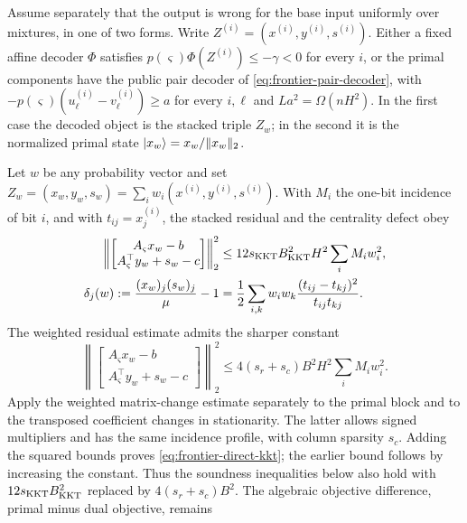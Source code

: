 \begin{proposition}
\label{prop:frontier-central-dichotomy}
Assume separately that the output is wrong for the base input uniformly
over mixtures, in one of two forms.  Write
\(Z^{(i)}=(x^{(i)},y^{(i)},s^{(i)})\).  Either a fixed affine
decoder \(\Phi\) satisfies
\(p(\varsigma)\Phi(Z^{(i)})\leq-\gamma<0\) for every \(i\), or the
primal components have the public pair decoder of
\eqref{eq:frontier-pair-decoder}, with
\(-p(\varsigma)(u_\ell^{(i)}-v_\ell^{(i)})\geq a\) for every \(i,\ell\)
and \(La^2=\Omega(nH^2)\).  In the first case the decoded object is the
stacked triple \(Z_w\); in the second it is the normalized primal state
\(\lvert x_w\rangle=x_w/\lVert x_w\rVert_2\).

Let \(w\) be any probability vector and set
\(Z_w=(x_w,y_w,s_w)=\sum_iw_i(x^{(i)},y^{(i)},s^{(i)})\).  With \(M_i\) the
one-bit incidence of bit \(i\), and with \(t_{ij}=x_j^{(i)}\), the stacked
residual and the centrality defect obey
\begin{align}
 \left\|
 \begin{bmatrix}A_\varsigma x_w-b\\
 A_\varsigma^\top y_w+s_w-c\end{bmatrix}\right\|_2^2
 &\leq12s_{\rm KKT}B_{\rm KKT}^2H^2\sum_iM_iw_i^2,
 \label{eq:frontier-weighted-kkt}\\
 \delta_j(w):=\frac{(x_w)_j(s_w)_j}{\mu}-1
 &=\frac12\sum_{i,k}w_iw_k
   \frac{(t_{ij}-t_{kj})^2}{t_{ij}t_{kj}}.
 \label{eq:frontier-weighted-centrality}
\end{align}
The weighted residual estimate admits the sharper constant
\begin{equation}
 \left\|
 \begin{bmatrix}A_\varsigma x_w-b\\
 A_\varsigma^\top y_w+s_w-c\end{bmatrix}\right\|_2^2
 \leq4(s_r+s_c)B^2H^2\sum_iM_iw_i^2.
 \label{eq:frontier-direct-kkt}
\end{equation}
Apply the weighted matrix-change estimate separately to the primal block
and to the transposed coefficient changes in stationarity.  The latter
allows signed multipliers and has the same incidence profile,
with column sparsity \(s_c\).  Adding the squared bounds proves
\eqref{eq:frontier-direct-kkt}; the earlier bound follows by increasing
the constant.  Thus the soundness inequalities below also hold with
\(12s_{\rm KKT}B_{\rm KKT}^2\) replaced by \(4(s_r+s_c)B^2\).
The algebraic objective difference, primal minus dual objective, remains

\end{proposition}
